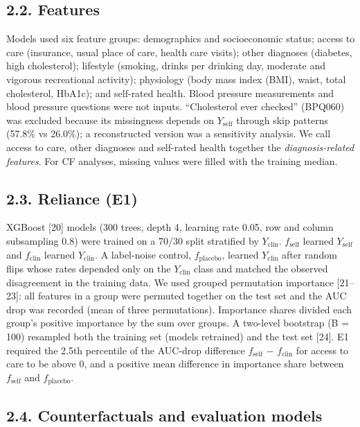 \documentclass[
  11pt,
]{article}
\begin{document}
\subsection{2.2. Features}

Models used six feature groups: demographics and socioeconomic status;
access to care (insurance, usual place of care, health care visits);
other diagnoses (diabetes, high cholesterol); lifestyle (smoking, drinks
per drinking day, moderate and vigorous recreational activity);
physiology (body mass index (BMI), waist, total cholesterol, HbA1c); and
self-rated health. Blood pressure measurements and blood pressure
questions were not inputs. ``Cholesterol ever checked'' (BPQ060) was
excluded because its missingness depends on \(Y_{\mathrm{self}}\)
through skip patterns (57.8\% vs 26.0\%); a reconstructed version was a
sensitivity analysis. We call access to care, other diagnoses and
self-rated health together the \emph{diagnosis-related features}. For CF
analyses, missing values were filled with the training median.

\subsection{2.3. Reliance (E1)}

XGBoost {[}20{]} models (300 trees, depth 4, learning rate 0.05, row and
column subsampling 0.8) were trained on a 70/30 split stratified by
\(Y_{\mathrm{clin}}\). \emph{\(f_{\mathrm{self}}\)} learned
\(Y_{\mathrm{self}}\) and \emph{\(f_{\mathrm{clin}}\)} learned
\(Y_{\mathrm{clin}}\). A label-noise control,
\emph{\(f_{\mathrm{placebo}}\)}, learned \(Y_{\mathrm{clin}}\) after
random flips whose rates depended only on the \(Y_{\mathrm{clin}}\)
class and matched the observed disagreement in the training data. We
used grouped permutation importance {[}21--23{]}: all features in a
group were permuted together on the test set and the AUC drop was
recorded (mean of three permutations). Importance shares divided each
group's positive importance by the sum over groups. A two-level
bootstrap (B = 100) resampled both the training set (models retrained)
and the test set {[}24{]}. E1 required the 2.5th percentile of the
AUC-drop difference \(f_{\mathrm{self}}\) − \(f_{\mathrm{clin}}\) for
access to care to be above 0, and a positive mean difference in
importance share between \(f_{\mathrm{self}}\) and
\(f_{\mathrm{placebo}}\).

\subsection{2.4. Counterfactuals and evaluation models}
\end{document}

